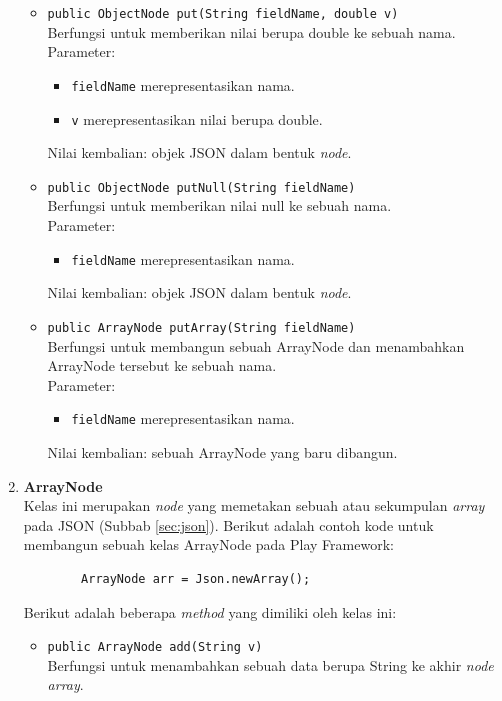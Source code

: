 \begin{enumerate}
\begin{itemize}
			\item \texttt{public ObjectNode put(String fieldName, double v)}\\
			Berfungsi untuk memberikan nilai berupa double ke sebuah nama.\\
			Parameter:
				\begin{itemize}
					\item \texttt{fieldName} merepresentasikan nama.
					\item \texttt{v} merepresentasikan nilai berupa double.
				\end{itemize}
			Nilai kembalian: objek JSON dalam bentuk \textit{node}.
			\item \texttt{public ObjectNode putNull(String fieldName)}\\
			Berfungsi untuk memberikan nilai null ke sebuah nama.\\
			Parameter:
				\begin{itemize}
					\item \texttt{fieldName} merepresentasikan nama.
				\end{itemize}
			Nilai kembalian: objek JSON dalam bentuk \textit{node}.
			\item \texttt{public ArrayNode putArray(String fieldName)}\\
			Berfungsi untuk membangun sebuah ArrayNode dan menambahkan ArrayNode tersebut ke sebuah nama.\\
			Parameter:
				\begin{itemize}
					\item \texttt{fieldName} merepresentasikan nama.
				\end{itemize}
			Nilai kembalian: sebuah ArrayNode yang baru dibangun.
		\end{itemize}
	\item \textbf{ArrayNode}\\
	Kelas ini merupakan \textit{node} yang memetakan sebuah atau sekumpulan \textit{array} pada JSON (Subbab \ref{sec:json}). Berikut adalah contoh kode untuk membangun sebuah kelas ArrayNode pada Play Framework:
	\begin{lstlisting}
		ArrayNode arr = Json.newArray();
	\end{lstlisting}
	Berikut adalah beberapa \textit{method} yang dimiliki oleh kelas ini:
		\begin{itemize}
			\item \texttt{public ArrayNode add(String v)}\\
			Berfungsi untuk menambahkan sebuah data berupa String ke akhir \textit{node} \textit{array}.\\

\end{itemize}
\end{enumerate}
